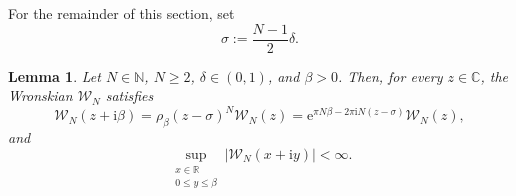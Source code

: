 \documentclass[11pt]{amsart}
\numberwithin{equation}{section}
\newtheorem{lemma}[theorem]{Lemma}
\theoremstyle{definition}
\theoremstyle{remark}
\newcommand{\R}{\mathbb R}
\newcommand{\C}{\mathbb C}
\newcommand{\N}{\mathbb N}
\newcommand{\ii}{\mathrm i}
\newcommand{\e}{\mathrm e}
\newcommand{\cW}{\mathcal W}
\begin{document}
For the remainder of this section, set
\begin{equation}\label{eq:sigma-definition}
    \sigma:=\frac{N-1}{2}\delta.
\end{equation}
\begin{lemma}\label{lem:W-automorphy}
    Let $N \in \N$, $N \geq 2$, $\delta \in (0,1)$, and $\beta >0$. Then, for every $z\in\C$, the Wronskian $\cW_N$ satisfies
    \begin{equation}\label{eq:W-automorphy}
        \cW_N(z+\ii\beta)
        = \rho_{\beta}(z-\sigma)^N \cW_N(z)
        =\e^{\pi N\beta-2\pi\ii N(z-\sigma)}\cW_N(z),
    \end{equation}
    and
    \begin{equation}\label{eq:W-strip-bound}
        \sup_{\substack{x\in\R\\0\leq y\leq\beta}}|\cW_N(x+\ii y)|<\infty.
    \end{equation}
\end{lemma}
\end{document}
